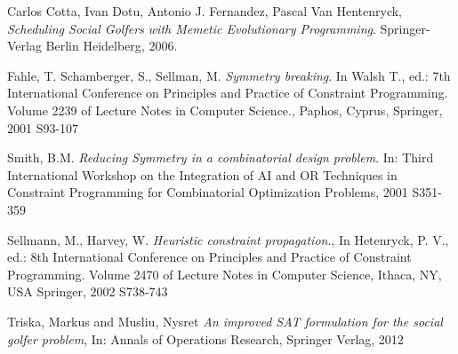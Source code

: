     Carlos Cotta, Ivan Dotu, Antonio J. Fernandez, Pascal Van Hentenryck,
    \emph{Scheduling Social Golfers with Memetic Evolutionary Programming}.
    Springer-Verlag Berlin Heidelberg,
    2006.

    Fahle, T. Schamberger, S., Sellman, M.
    \emph{Symmetry breaking}.
    In Walsh T., ed.: 7th International Conference on Principles and Practice of Constraint Programming. Volume 2239 of Lecture Notes in Computer Science., Paphos, Cyprus,
    Springer,
    2001 S93-107

    Smith, B.M.
    \emph{Reducing Symmetry in a combinatorial design problem}.
    In: Third International Workshop on the Integration of AI and OR Techniques in Constraint Programming for Combinatorial Optimization Problems,
    2001 S351-359

    Sellmann, M., Harvey, W.
    \emph{Heuristic constraint propagation}.,
    In Hetenryck, P. V., ed.: 8th International Conference on Principles and Practice of Constraint Programming. Volume 2470 of Lecture Notes in Computer Science,
    Ithaca, NY, USA
    Springer,
    2002 S738-743

    Triska, Markus and Musliu, Nysret
    \emph{An improved SAT formulation for the social golfer problem},
    In: Annals of Operations Research,
    Springer Verlag,
    2012


